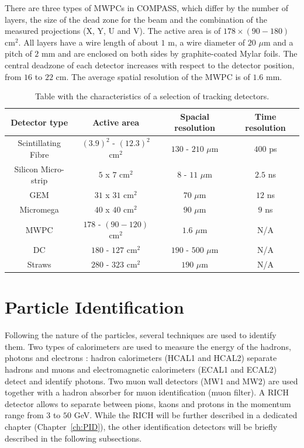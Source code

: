 There are three types of MWPCs in COMPASS, which differ by the number of layers, the size of the dead zone for the beam and the combination of the measured projections (X, Y, U and V). The active area is of $178 \times (90-180)$ cm$^2$. All layers have a wire length of about $1$ m, a wire diameter of $20$ $\mu$m and a pitch of $2$ mm and are enclosed on both sides by graphite-coated Mylar foils. The central deadzone of each detector increases with respect to the detector position, from $16$ to $22$ cm. The average spatial resolution of the MWPC is of $1.6$ mm.

\begin{table}[!h]
  \caption{Table with the characteristics of a selection of tracking detectors.}
  \label{tab:kinvar}
  \centering
  \begin{tabular}{c|c|c|c}
    \hline
    \hline
    Detector type & Active area & Spacial resolution & Time resolution \\
    \hline
    \hline
    Scintillating Fibre & $(3.9)^2$ - $(12.3)^2$ cm$^2$ & $130$ - $210$ $\mu$m & $400$ ps \\
    Silicon Micro-strip & $5$ x $7$ cm$^2$ & $8$ - $11$ $\mu$m & $2.5$ ns \\
    GEM & $31$ x $31$ cm$^2$ & $70$ $\mu$m & $12$ ns \\
    Micromega & $40$ x $40$ cm$^2$ & $90$ $\mu$m & $9$ ns \\
    MWPC & $178$ - $(90-120)$ cm$^2$ & $1.6$ $\mu$m & N/A \\
    DC & $180$ - $127$ cm$^2$ & $190$ - $500$ $\mu$m & N/A \\
    Straws & $280$ - $323$ cm$^2$ & $190$ $\mu$m & N/A \\
    \hline
    \hline
  \end{tabular}
\end{table}


\section{Particle Identification}

Following the nature of the particles, several techniques are used to identify them. Two types of calorimeters are used to measure the energy of the hadrons, photons and electrons : hadron calorimeters (HCAL1 and HCAL2) separate hadrons and muons and electromagnetic calorimeters (ECAL1 and ECAL2) detect and identify photons. Two muon wall detectors (MW1 and MW2) are used together with a hadron absorber for muon identification (muon filter). A RICH detector allows to separate between pions, kaons and protons in the momentum range from $3$ to $50$ GeV. While the RICH will be further described in a dedicated chapter (Chapter~\ref{ch:PID}), the other identification detectors will be briefly described in the following subsections.

